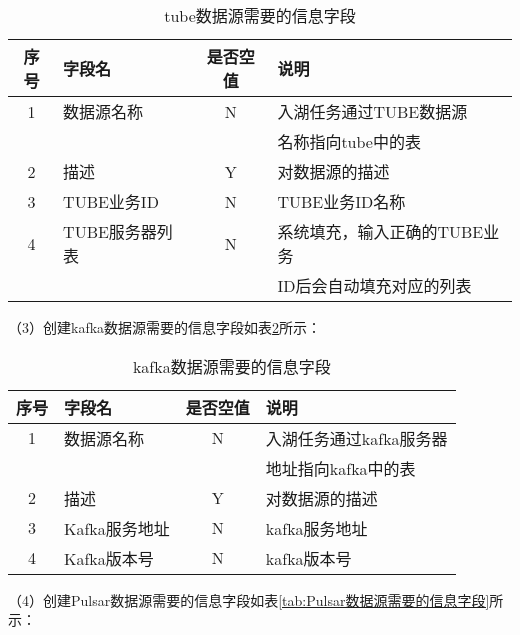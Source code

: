 \begin{table}[H]
  \centering
  \caption{tube数据源需要的信息字段}
  \label{tab:tube数据源需要的信息字段}
  \begin{tabular}{clcl}
    \toprule
    序号  & 字段名     & 是否空值   & 说明                                      \\
    \midrule
    1    & 数据源名称  & N        & 入湖任务通过TUBE数据源   \\
         &           &          & 名称指向tube中的表       \\
    2    & 描述       & Y        & 对数据源的描述                                \\
    3    & TUBE业务ID     & N        & TUBE业务ID名称                             \\
    4    & TUBE服务器列表       & N        &  系统填充，输入正确的TUBE业务     \\
         &                   &            &  ID后会自动填充对应的列表         \\
    \bottomrule
  \end{tabular}
\end{table}

（3）创建kafka数据源需要的信息字段如表\ref{tab:kafka数据源需要的信息字段}所示：

\begin{table}[H]
  \centering
  \caption{kafka数据源需要的信息字段}
  \label{tab:kafka数据源需要的信息字段}
  \begin{tabular}{clcl}
    \toprule
    序号  & 字段名     & 是否空值   & 说明                                      \\
    \midrule
    1    & 数据源名称  & N        & 入湖任务通过kafka服务器  \\
         &           &          &  地址指向kafka中的表 \\
    2    & 描述       & Y        & 对数据源的描述                               \\
    3    & Kafka服务地址    & N        & kafka服务地址                           \\
    4    & Kafka版本号      & N        &  kafka版本号       \\
    \bottomrule
  \end{tabular}
\end{table}

（4）创建Pulsar数据源需要的信息字段如表\ref{tab:Pulsar数据源需要的信息字段}所示：

